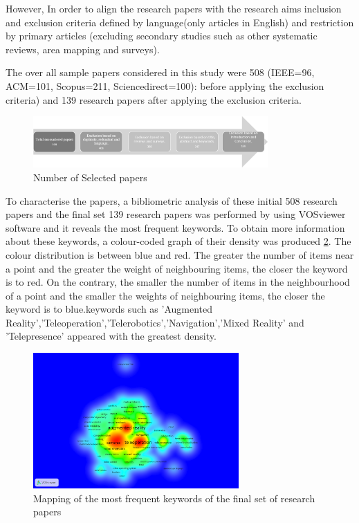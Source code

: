 However, In order to align the research papers with the research aims inclusion and exclusion criteria  defined by language(only articles in English) and restriction by primary articles (excluding secondary studies such as other systematic reviews, area mapping and surveys).

The over all sample papers considered in this study were 508 (IEEE=96, ACM=101, Scopus=211, Sciencedirect=100): before applying the exclusion criteria) and 139 research papers after applying the exclusion criteria.

\begin{figure}[h]
    \centering
    \includegraphics[width=0.8\textwidth]{images/Selected_papers.png}
    \caption{Number of Selected papers}
    \label{fig:PapersNumber}
\end{figure}

To characterise the papers, a bibliometric analysis of these initial 508 research papers and the final set 139 research papers was performed by using VOSviewer software and it reveals the most frequent keywords. To obtain more information about these keywords, a colour-coded graph of their density was produced \ref{fig:final Density}. The colour distribution is between blue and red. The greater the number of items near a point and the greater the weight of neighbouring items, the closer the keyword is to red. On the contrary, the smaller the number of items in the neighbourhood of a point and the smaller the weights of neighbouring items, the closer the keyword is to blue.keywords such as 'Augmented Reality','Teleoperation','Telerobotics','Navigation','Mixed Reality' and 'Telepresence' appeared with the greatest density.

\begin{figure}[h]
    \centering
    \includegraphics[width=0.7\textwidth]{images/Density_3.png}
    \caption{Mapping of the most frequent keywords of the final set of research papers}
    \label{fig:final Density}
\end{figure}

